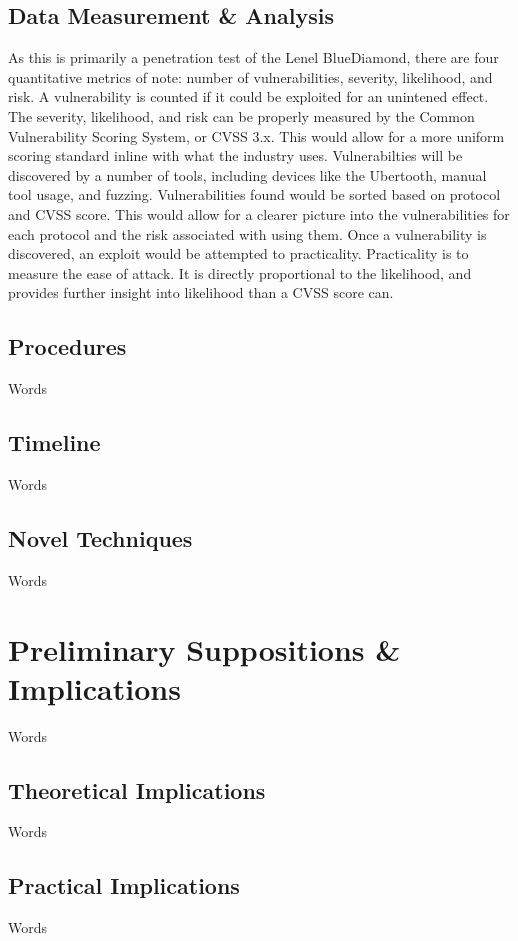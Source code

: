 \documentclass[10pt,twocolumn,letterpaper]{article}
\begin{document}
\subsection{Data Measurement \& Analysis}
As this is primarily a penetration test of the Lenel BlueDiamond, there are four quantitative metrics of note: number of vulnerabilities, severity, likelihood, and risk. A vulnerability is counted if it could be exploited for an unintened effect. The severity, likelihood, and risk can be properly measured by the Common Vulnerability Scoring System, or CVSS 3.x. This would allow for a more uniform scoring standard inline with what the industry uses. Vulnerabilties will be discovered by a number of tools, including devices like the Ubertooth, manual tool usage, and fuzzing. Vulnerabilities found would be sorted based on protocol and CVSS score. This would allow for a clearer picture into the vulnerabilities for each protocol and the risk associated with using them. Once a vulnerability is discovered, an exploit would be attempted to practicality. Practicality is to measure the ease of attack. It is directly proportional to the likelihood, and provides further insight into likelihood than a CVSS score can.

\subsection{Procedures}
Words

\subsection{Timeline}
Words

\subsection{Novel Techniques}
Words

\section{Preliminary Suppositions \& Implications}
Words

\subsection{Theoretical Implications}
Words

\subsection{Practical Implications}
Words
\end{document}
